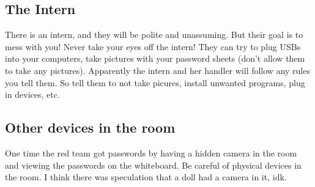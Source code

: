 \documentclass{article}
\begin{document}
\subsection{The Intern}
There is an intern, and they will be polite and unassuming. But their goal is to mess with you! Never take your eyes off the intern!
They can try to plug USBs into your computers, take pictures with your password sheets (don't allow them to take any pictures).
Apparently the intern and her handler will follow any rules you tell them. So tell them to not take picures, install unwanted programs, plug in devices, etc.

\subsection{Other devices in the room}
One time the red team got passwords by having a hidden camera in the room and viewing the passwords on the whiteboard. 
Be careful of physical devices in the room. I think there was speculation that a doll had a camera in it, idk.
\end{document}
